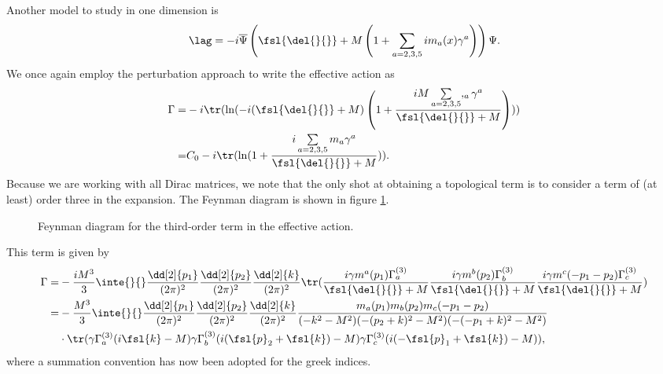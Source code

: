 Another model to study in one dimension is
\begin{align*}
	\lag = -i\overline{\Psi}\left(\fsl{\del{}{}} + M\left(1 + \sum\limits_{a = 2, 3, 5}im_{a}(x)\gamma^{a}\right)\right)\Psi.
\end{align*}
We once again employ the perturbation approach to write the effective action as
\begin{align*}
	\Gamma =& -i\tr(\ln(-i(\fsl{\del{}{}} + M)\left(1 + \frac{iM\sum\limits_{a = 2, 3, 5},_{a}\gamma^{a}}{\fsl{\del{}{}} + M}\right))) \\
	       =& C_{0} - i\tr(\ln(1 + \frac{i\sum\limits_{a = 2, 3, 5}m_{a}\gamma^{a}}{\fsl{\del{}{}} + M})).
\end{align*}
Because we are working with all Dirac matrices, we note that the only shot at obtaining a topological term is to consider a term of (at least) order three in the expansion. The Feynman diagram is shown in figure \ref{fig:third_order_fd}.

\begin{figure}[!ht]
	\centering
	\caption{Feynman diagram for the third-order term in the effective action.}
	\label{fig:third_order_fd}
\end{figure}

This term is given by
\begin{align*}
\Gamma =& -\frac{iM^{3}}{3}\inte{}{}\frac{\dd[2]{p_{1}}}{(2\pi)^{2}}\frac{\dd[2]{p_{2}}}{(2\pi)^{2}}\frac{\dd[2]{k}}{(2\pi)^{2}}\tr(\frac{i\gamma m^{a}(p_{1})\Gamma_{a}^{(3)}}{\fsl{\del{}{}} + M}\frac{i\gamma m^{b}(p_{2})\Gamma_{b}^{(3)}}{\fsl{\del{}{}} + M}\frac{i\gamma m^{c}(-p_{1} - p_{2})\Gamma_{c}^{(3)}}{\fsl{\del{}{}} + M}) \\
=& -\frac{M^{3}}{3}\inte{}{}\frac{\dd[2]{p_{1}}}{(2\pi)^{2}}\frac{\dd[2]{p_{2}}}{(2\pi)^{2}}\frac{\dd[2]{k}}{(2\pi)^{2}}\frac{m_{a}(p_{1})m_{b}(p_{2})m_{c}(-p_{1} - p_{2})}{(-k^{2} - M^{2})(-(p_{2} + k)^{2} - M^{2})(-(-p_{1} + k)^{2} - M^{2})} \\
&\cdot\tr(\gamma\Gamma_{a}^{(3)}(i\fsl{k} - M)\gamma\Gamma_{b}^{(3)}(i(\fsl{p}_{2} + \fsl{k}) - M)\gamma\Gamma_{c}^{(3)}(i(-\fsl{p}_{1} + \fsl{k}) - M)),
\end{align*}
where a summation convention has now been adopted for the greek indices.

